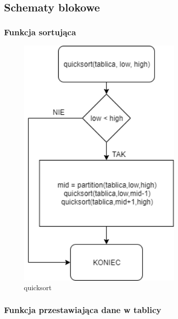 \documentclass[11pt]{article}
\begin{document}
    \hypertarget{schematy-blokowe}{%
\subsection{Schematy blokowe}\label{schematy-blokowe}}

\hypertarget{funkcja-sortujux105ca}{%
\subsubsection{Funkcja sortująca}\label{funkcja-sortujux105ca}}

\begin{figure}
\centering
\includegraphics[width=80mm,scale=1.5]{Quicksort/Quicksort.png}
\caption{quicksort}
\end{figure}

\hypertarget{funkcja-przestawiajux105ca-dane-w-tablicy}{%
\subsubsection{Funkcja przestawiająca dane w
tablicy}\label{funkcja-przestawiajux105ca-dane-w-tablicy}}
\end{document}
